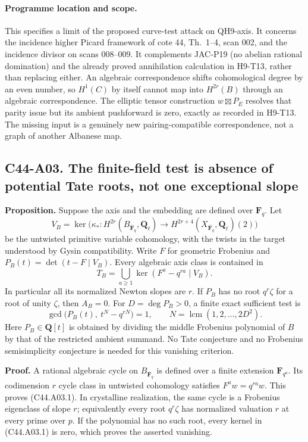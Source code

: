 \documentclass[11pt]{article}
\theoremstyle{remark}\newtheorem{remark}[theorem]{Remark}
\begin{document}
\paragraph{Programme location and scope.}
This specifies a limit of the proposed curve-test attack on
QH9-axis. It concerns the incidence higher Picard framework of
cote 44, Th.~1--4, scan 002, and the incidence divisor on scans
008--009. It complements JAC-P19 (no abelian rational domination)
and the already proved annihilation calculation in H9-T13, rather
than replacing either. An algebraic correspondence shifts
cohomological degree by an even number, so $H^1(C)$ by itself
cannot map into $H^{2r}(B)$ through an algebraic correspondence.
The elliptic tensor construction $w\boxtimes P_E$ resolves that
parity issue but its ambient pushforward is zero, exactly as
recorded in H9-T13. The missing input is a genuinely new
pairing-compatible correspondence, not a graph of another
Albanese map.

\subsection*{C44-A03. The finite-field test is absence of potential Tate roots, not one exceptional slope}

\textbf{Proposition.}
Suppose the axis and the embedding are defined over $\mathbf F_q$.
Let
\[
 V_B=\ker\bigl(\kappa_*:H^{2r}(B_{\overline{\mathbf F}_q},
 \mathbf Q_\ell)\longrightarrow H^{2r+4}(X_{\overline{\mathbf F}_q},
 \mathbf Q_\ell)(2)\bigr)
\]
be the untwisted primitive variable cohomology, with the twists in
the target understood by Gysin compatibility. Write $F$ for
geometric Frobenius and $P_B(t)=\det(t-F\mid V_B)$.
Every algebraic axis class is contained in
\[
 T_B=\bigcup_{a\ge1}\ker(F^a-q^{ra}\mid V_B).                \tag{C44.A03.1}
\]
In particular all its normalized Newton slopes are $r$.
If $P_B$ has no root $q^r\zeta$ for a root of unity $\zeta$,
then $A_B=0$.
For $D=\deg P_B>0$, a finite exact sufficient test is
\[
 \gcd\bigl(P_B(t),\ t^N-q^{rN}\bigr)=1,
 \qquad N=\operatorname{lcm}(1,2,\ldots,2D^2).               \tag{C44.A03.2}
\]
Here $P_B\in\mathbf Q[t]$ is obtained by dividing the middle
Frobenius polynomial of $B$ by that of the restricted ambient
summand. No Tate conjecture and no Frobenius semisimplicity
conjecture is needed for this vanishing criterion.

\textbf{Proof.}
A rational algebraic cycle on $B_{\overline{\mathbf F}_q}$ is
defined over a finite extension $\mathbf F_{q^a}$. Its codimension
$r$ cycle class in untwisted cohomology satisfies $F^a w=q^{ra}w$.
This proves (C44.A03.1). In crystalline realization, the same
cycle is a Frobenius eigenclass of slope $r$; equivalently every
root $q^r\zeta$ has normalized valuation $r$ at every prime over
$p$.
If the polynomial has no such root, every kernel in (C44.A03.1)
is zero, which proves the asserted vanishing.
\end{document}
